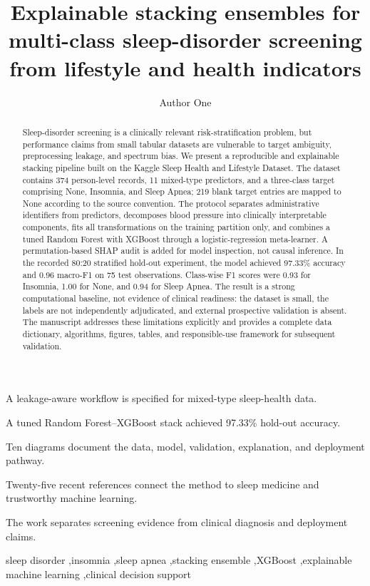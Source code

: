 ﻿\documentclass[preprint,12pt]{elsarticle}
\begin{document}
\begin{frontmatter}
\title{Explainable stacking ensembles for multi-class sleep-disorder screening from lifestyle and health indicators}
\author[bracu]{Author One}
\address[bracu]{Department of Computer Science and Engineering, BRAC University, Dhaka, Bangladesh}

\begin{abstract}
Sleep-disorder screening is a clinically relevant risk-stratification problem, but performance claims from small tabular datasets are vulnerable to target ambiguity, preprocessing leakage, and spectrum bias. We present a reproducible and explainable stacking pipeline built on the Kaggle Sleep Health and Lifestyle Dataset. The dataset contains 374 person-level records, 11 mixed-type predictors, and a three-class target comprising None, Insomnia, and Sleep Apnea; 219 blank target entries are mapped to None according to the source convention. The protocol separates administrative identifiers from predictors, decomposes blood pressure into clinically interpretable components, fits all transformations on the training partition only, and combines a tuned Random Forest with XGBoost through a logistic-regression meta-learner. A permutation-based SHAP audit is added for model inspection, not causal inference. In the recorded 80:20 stratified hold-out experiment, the model achieved 97.33\% accuracy and 0.96 macro-F1 on 75 test observations. Class-wise F1 scores were 0.93 for Insomnia, 1.00 for None, and 0.94 for Sleep Apnea. The result is a strong computational baseline, not evidence of clinical readiness: the dataset is small, the labels are not independently adjudicated, and external prospective validation is absent. The manuscript addresses these limitations explicitly and provides a complete data dictionary, algorithms, figures, tables, and responsible-use framework for subsequent validation.
\end{abstract}

\begin{highlights}
\item A leakage-aware workflow is specified for mixed-type sleep-health data.
\item A tuned Random Forest--XGBoost stack achieved 97.33\% hold-out accuracy.
\item Ten diagrams document the data, model, validation, explanation, and deployment pathway.
\item Twenty-five recent references connect the method to sleep medicine and trustworthy machine learning.
\item The work separates screening evidence from clinical diagnosis and deployment claims.
\end{highlights}

\begin{keyword}
sleep disorder \sep insomnia \sep sleep apnea \sep stacking ensemble \sep XGBoost \sep explainable machine learning \sep clinical decision support
\end{keyword}
\end{frontmatter}
\end{document}
